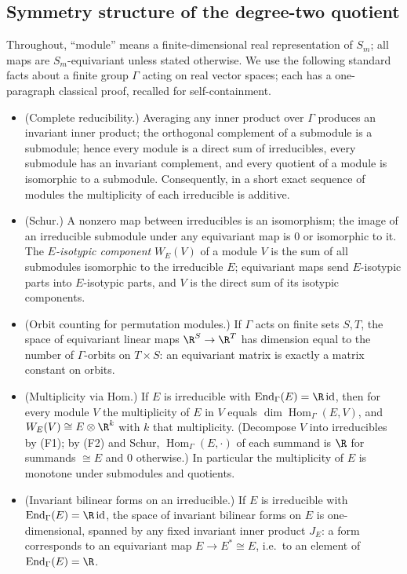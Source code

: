 \documentclass[../main.tex]{subfiles}
\begin{document}
\subsection*{Symmetry structure of the degree-two quotient}

Throughout, ``module'' means a finite-dimensional real representation of $S_m$; all
maps are $S_m$-equivariant unless stated otherwise.  We use the following standard
facts about a finite group $\Gamma$ acting on real vector spaces; each has a
one-paragraph classical proof, recalled for self-containment.
\begin{itemize}
\item[(F1)] (Complete reducibility.)  Averaging any inner product over $\Gamma$
  produces an invariant inner product; the orthogonal complement of a submodule is a
  submodule; hence every module is a direct sum of irreducibles, every submodule has
  an invariant complement, and every quotient of a module is isomorphic to a
  submodule.  Consequently, in a short exact sequence of modules the multiplicity of
  each irreducible is additive.
\item[(F2)] (Schur.)  A nonzero map between irreducibles is an isomorphism; the image
  of an irreducible submodule under any equivariant map is $0$ or isomorphic to it.
  The \emph{$E$-isotypic component} $W_E(V)$ of a module $V$ is the sum of all
  submodules isomorphic to the irreducible $E$; equivariant maps send
  $E$-isotypic parts into $E$-isotypic parts, and $V$ is the direct sum of its
  isotypic components.
\item[(F3)] (Orbit counting for permutation modules.)  If $\Gamma$ acts on finite
  sets $S,T$, the space of equivariant linear maps $\R^S\to\R^T$ has dimension equal
  to the number of $\Gamma$-orbits on $T\times S$: an equivariant matrix is exactly a
  matrix constant on orbits.
\item[(F4)] (Multiplicity via Hom.)  If $E$ is irreducible with
  $\operatorname{End}_\Gamma(E)=\R\,\mathrm{id}$, then for every module $V$ the
  multiplicity of $E$ in $V$ equals $\dim\operatorname{Hom}_\Gamma(E,V)$, and
  $W_E(V)\cong E\otimes\R^{k}$ with $k$ that multiplicity.  (Decompose $V$ into
  irreducibles by (F1); by (F2) and Schur, $\operatorname{Hom}_\Gamma(E,\cdot)$ of each
  summand is $\R$ for summands $\cong E$ and $0$ otherwise.)  In particular the
  multiplicity of $E$ is monotone under submodules and quotients.
\item[(F5)] (Invariant bilinear forms on an irreducible.)  If $E$ is irreducible with
  $\operatorname{End}_\Gamma(E)=\R\,\mathrm{id}$, the space of invariant bilinear
  forms on $E$ is one-dimensional, spanned by any fixed invariant inner product
  $J_E$: a form corresponds to an equivariant map $E\to E^*\cong E$, i.e.\ to an
  element of $\operatorname{End}_\Gamma(E)=\R$.
\end{itemize}
\end{document}
